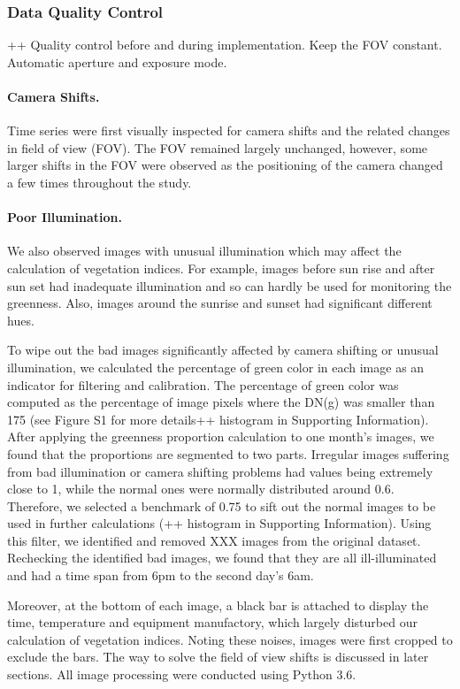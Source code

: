\documentclass{article}
\begin{document}
\subsubsection{Data Quality Control}
++ Quality control before and during implementation. Keep the FOV constant. Automatic aperture and exposure mode. 

\paragraph{Camera Shifts.} Time series were first visually inspected for camera shifts and the related changes in field of view (FOV). The FOV remained largely unchanged, however, some larger shifts in the FOV were observed as the positioning of the camera changed a few times throughout the study. 

\paragraph{Poor Illumination.} We also observed images with unusual illumination which may affect the calculation of vegetation indices. For example, images before sun rise and after sun set had inadequate illumination and so can hardly be used for monitoring the greenness. Also, images around the sunrise and sunset had significant different hues. 

To wipe out the bad images significantly affected by camera shifting or unusual illumination, we calculated the percentage of green color in each image as an indicator for filtering and calibration. The percentage of green color was computed as the percentage of image pixels where the DN(g) was smaller than 175 (see Figure S1 for more details++ histogram in Supporting Information). After applying the greenness proportion calculation to one month’s images, we found that the proportions are segmented to two parts. Irregular images suffering from bad illumination or camera shifting problems had values being extremely close to 1, while the normal ones were normally distributed around 0.6. Therefore, we selected a benchmark of 0.75 to sift out the normal images to be used in further calculations (++ histogram in Supporting Information). Using this filter, we identified and removed XXX images  from the original dataset. Rechecking the identified bad images, we found that they are all ill-illuminated and had a time span from 6pm to the second day’s 6am.

Moreover, at the bottom of each image, a black bar is attached to display the time, temperature and equipment manufactory, which largely disturbed our calculation of vegetation indices. Noting these noises, images were first cropped to exclude the bars. The way to solve the field of view shifts is discussed in later sections. All image processing were conducted using Python 3.6. 
\end{document}
